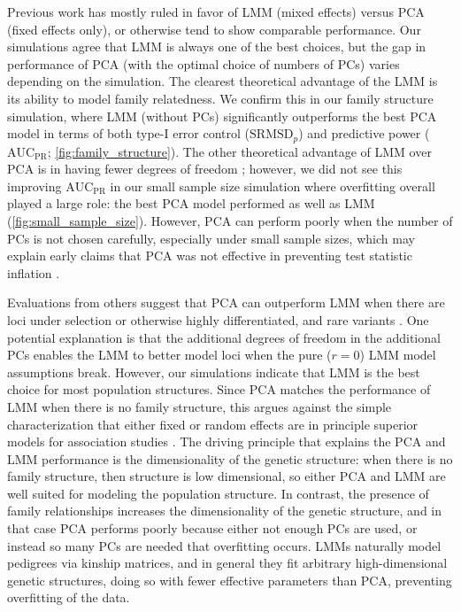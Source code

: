\documentclass[11pt]{article}
\newcommand{\rmsd}{\text{SRMSD}_p}
\newcommand{\auc}{\text{AUC}_\text{PR}}
\begin{document}
Previous work has mostly ruled in favor of LMM (mixed effects) versus PCA (fixed effects only), or otherwise tend to show comparable performance.
Our simulations agree that LMM is always one of the best choices, but the gap in performance of PCA (with the optimal choice of numbers of PCs) varies depending on the simulation.
The clearest theoretical advantage of the LMM is its ability to model family relatedness.
We confirm this in our family structure simulation, where LMM (without PCs) significantly outperforms the best PCA model in terms of both type-I error control ($\rmsd$) and predictive power ($\auc$; \cref{fig:family_structure}).
The other theoretical advantage of LMM over PCA is in having fewer degrees of freedom \citep{hoffman_correcting_2013}; however, we did not see this improving $\auc$ in our small sample size simulation where overfitting overall played a large role: the best PCA model performed as well as LMM (\cref{fig:small_sample_size}).
However, PCA can perform poorly when the number of PCs is not chosen carefully, especially under small sample sizes, which may explain early claims that PCA was not effective in preventing test statistic inflation \citep{epstein_simple_2007, kimmel_randomization_2007, luca_use_2008}.

Evaluations from others suggest that PCA can outperform LMM when there are loci under selection or otherwise highly differentiated, and rare variants \citep{price_new_2010, wu_comparison_2011, yang_advantages_2014}.
One potential explanation is that the additional degrees of freedom in the additional PCs enables the LMM to better model loci when the pure ($r=0$) LMM model assumptions break.
However, our simulations indicate that LMM is the best choice for most population structures.
Since PCA matches the performance of LMM when there is no family structure, this argues against the simple characterization that either fixed or random effects are in principle superior models for association studies \citep{price_new_2010, sul_mixed_2013, price_response_2013, sul_population_2018}.
The driving principle that explains the PCA and LMM performance is the dimensionality of the genetic structure:
when there is no family structure, then structure is low dimensional, so either PCA and LMM are well suited for modeling the population structure.
In contrast, the presence of family relationships increases the dimensionality of the genetic structure, and in that case PCA performs poorly because either not enough PCs are used, or instead so many PCs are needed that overfitting occurs.
LMMs naturally model pedigrees via kinship matrices, and in general they fit arbitrary high-dimensional genetic structures, doing so with fewer effective parameters than PCA, preventing overfitting of the data.
\end{document}

